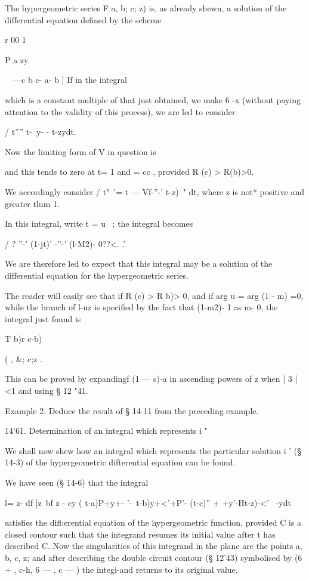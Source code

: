 The hypergeometric series F a, b; c; z) is, as already shewn, a
solution of the differential equation defined by the scheme

r 00 1 \

P a zy

\ \ —c b c- a- b ] If in the integral

which is a constant multiple of that just obtained, we make 6 -x
(without paying attention to the validity of this process), we are led
to consider

/ t'''' t-\ y- - t-zydt.

Now the limiting form of V in question is

and this tends to zero at t= 1 and = cc , provided R (c) > R(b)>0.

We accordingly consider / t"~'= t — Vf-''-' t-z)~" dt, where z is not*
positive and greater tlum 1.

In this integral, write t = u~ ; the integral becomes

/ ? ''-' (1-jt)' -''-' (l-M2)- 0??<. .'

We are therefore led to expect that this integral may be a solution of
the differential equation for the hypergeometric series.

The reader will easily see that if R (c) > R b)> 0, and if arg u = arg
(1 - m) =0, while the branch of l-uz is specified by the fact that
(1-m2)- 1 as m- 0, the integral just found is

T b)r c-b)

  ( , \&; c;z .

This can be proved by expandingf (1 — s)-a in ascending powers of z
when | 3 | <1 and using § 12 "41.

Example 2. Deduce the result of § 14-11 from the preceding example.

14'61. Determination of an integral which represents i "\

We shall now shew how an integral which represents the particular
solution i ' (§ 14-3) of the hypergeometric difterential equation can
be found.

We have seen (§ 14-6) that the integral

l= z- df [z~bf z - cy ( t-a)P+y+- '-\ t-b)y+<'+P'- (t-c)'' +
+y'-Ht-z)-<'~ -ydt

satisfies the difl:erential equation of the hypergeometric function,
provided C is a closed contour such that the integrand resumes its
initial value after t has described C. Now the singularities of this
integrand in the plane are the points a, b, c, z; and after describing
the double circuit contour (§ 12'43) symbolised by (6 + , c-h, 6 — , c
— ) the integi-and returns to its original value.

